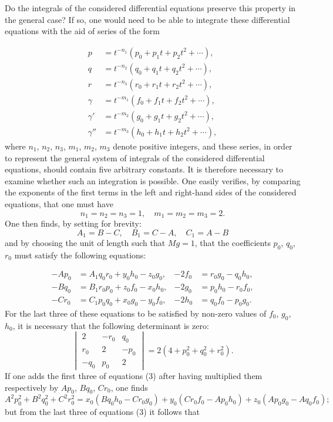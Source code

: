 \documentclass{article}
\begin{document}
Do the integrals of the considered differential equations preserve this property in the general case?
If so, one would need to be able to integrate these differential equations with the aid of series of the form

\begin{equation}
\begin{aligned}
p &= t^{-n_1}(p_0 + p_1t + p_2t^2 + \cdots), \\
q &= t^{-n_2}(q_0 + q_1t + q_2t^2 + \cdots), \\
r &= t^{-n_3}(r_0 + r_1t + r_2t^2 + \cdots), \\
\gamma &= t^{-m_1}(f_0 + f_1t + f_2t^2 + \cdots), \\
\gamma' &= t^{-m_2}(g_0 + g_1t + g_2t^2 + \cdots), \\
\gamma'' &= t^{-m_3}(h_0 + h_1t + h_2t^2 + \cdots),
\end{aligned}
\end{equation}
where $n_1$, $n_2$, $n_3$, $m_1$, $m_2$, $m_3$ denote positive integers, and these series, in order to represent the general system of integrals of the considered differential equations, should contain five arbitrary constants.
It is therefore necessary to examine whether such an integration is possible.
One easily verifies, by comparing the exponents of the first terms in the left and right-hand sides of the considered equations, that one must have
\[
n_1 = n_2 = n_3 = 1, \quad m_1 = m_2 = m_3 = 2.
\]
One then finds, by setting for brevity:
\[
A_1 = B - C, \quad B_1 = C - A, \quad C_1 = A - B
\]
and by choosing the unit of length such that $Mg = 1$, that the coefficients $p_0$, $q_0$, $r_0$ must satisfy the following equations:

\begin{equation}
\begin{aligned}
-Ap_0 &= A_1q_0r_0 + y_0h_0 - z_0g_0, & -2f_0 &= r_0g_0 - q_0h_0, \\
-Bq_0 &= B_1r_0p_0 + z_0f_0 - x_0h_0, & -2g_0 &= p_0h_0 - r_0f_0, \\
-Cr_0 &= C_1p_0q_0 + x_0g_0 - y_0f_0, & -2h_0 &= q_0f_0 - p_0g_0.
\end{aligned}
\end{equation}
For the last three of these equations to be satisfied by non-zero values of $f_0$, $g_0$, $h_0$, it is necessary that the following determinant is zero:
\[
\begin{vmatrix}
2 & -r_0 & q_0 \\
r_0 & 2 & -p_0 \\
-q_0 & p_0 & 2
\end{vmatrix} = 2(4 + p_0^2 + q_0^2 + r_0^2).
\]
If one adds the first three of equations (3) after having multiplied them respectively by $Ap_0$, $Bq_0$, $Cr_0$, one finds
\begin{equation}
A^2p_0^2 + B^2q_0^2 + C^2r_0^2 = x_0(Bq_0h_0 - Cr_0g_0) + y_0(Cr_0f_0 - Ap_0h_0) + z_0(Ap_0g_0 - Aq_0f_0);
\end{equation}
but from the last three of equations (3) it follows that
\end{document}
